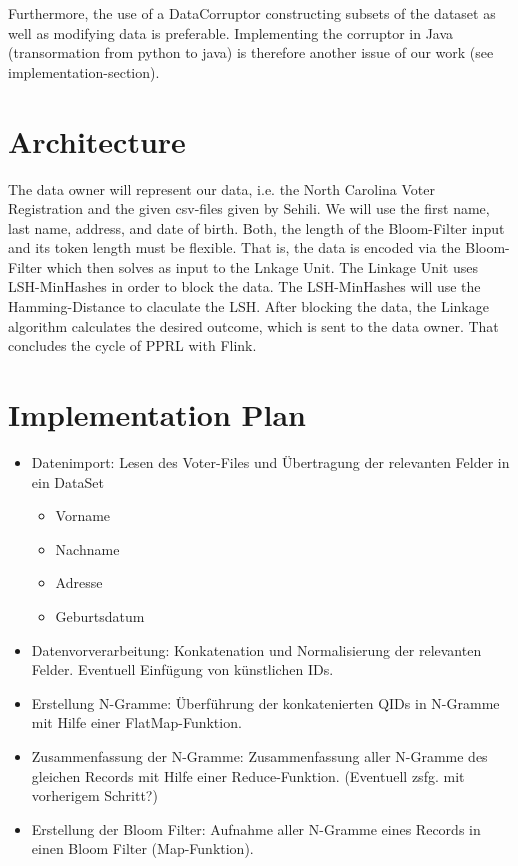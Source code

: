 \documentclass[10pt]{article}
\begin{document}
            Furthermore, the use of a DataCorruptor constructing subsets of the dataset as well as
            modifying data is preferable. Implementing the corruptor in Java (transormation from python to java)
            is therefore another issue of our work (see implementation-section).


    \section{Architecture}


        The data owner will represent our data, i.e. the North Carolina Voter Registration and the
        given csv-files given by Sehili. We will use the first name, last name, address, and date of birth.
        Both, the length of the Bloom-Filter input and its token length must be flexible. That is, the data is encoded
        via the Bloom-Filter which then solves as input to the Lnkage Unit.
        The Linkage Unit uses LSH-MinHashes in order to block the data. The LSH-MinHashes will use the Hamming-Distance
        to claculate the LSH. After blocking the data, the Linkage algorithm calculates the desired outcome,
        which is sent to the data owner. That concludes the cycle of PPRL with Flink.

    \section{Implementation Plan}


		\begin{itemize}
			\item Datenimport: Lesen des Voter-Files und Übertragung der relevanten Felder in
			 ein DataSet
			\begin{itemize}
				\item Vorname
				\item Nachname
				\item Adresse
				\item Geburtsdatum
			\end{itemize}
			\item Datenvorverarbeitung: Konkatenation und Normalisierung der relevanten
			 Felder. Eventuell Einfügung von künstlichen IDs.
			\item Erstellung N-Gramme: Überführung der konkatenierten QIDs in N-Gramme mit
			 Hilfe einer FlatMap-Funktion.
			\item Zusammenfassung der N-Gramme: Zusammenfassung aller N-Gramme des
			 gleichen Records mit Hilfe einer Reduce-Funktion. (Eventuell zsfg. mit vorherigem
			  Schritt?)
			\item Erstellung der Bloom Filter: Aufnahme aller N-Gramme eines Records in einen
			 Bloom Filter (Map-Funktion).
		\end{itemize}
\end{document}
